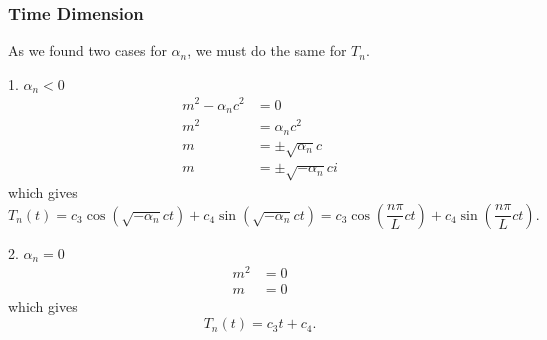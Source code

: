 \documentclass{article}
\begin{document}
\subsubsection{Time Dimension}
As we found two cases for \(\alpha_n\), we must do the same for \(T_n\).
\begin{proofcase}{1. \(\alpha_n < 0\)}\let\qed\relax
    \begin{align*}
        m^2 - \alpha_n c^2 & = 0                        \\
        m^2                & = \alpha_n c^2             \\
        m                  & = \pm \sqrt{\alpha_n} c    \\
        m                  & = \pm \sqrt{-\alpha_n} c i
    \end{align*}
    which gives
    \begin{equation*}
        T_n\left( t \right) = c_3 \cos{\left( \sqrt{-\alpha_n} c t \right)} + c_4 \sin{\left( \sqrt{-\alpha_n} c t \right)} = c_3 \cos{\left( \frac{n \pi}{L} c t \right)} + c_4 \sin{\left( \frac{n \pi}{L} c t \right)}.
    \end{equation*}
\end{proofcase}
\begin{proofcase}{2. \(\alpha_n = 0\)}\let\qed\relax
    \begin{align*}
        m^2 & = 0 \\
        m   & = 0
    \end{align*}
    which gives
    \begin{equation*}
        T_n\left( t \right) = c_3 t + c_4.
    \end{equation*}
\end{proofcase}
\end{document}
